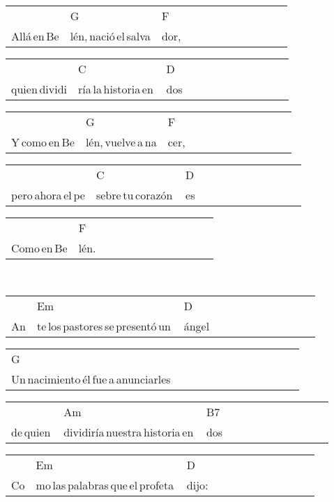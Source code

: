 \begin{multicols}{2}
\noindent
\begin{minipage}{\columnwidth}
\noindent
\noindent
\begin{tabular}{llllllllllll}
&G&F\\
Allá\,en\,Be&lén,\,nació\,el\,salva&dor,
\end{tabular}

\noindent
\begin{tabular}{llllllllllll}
&C&D\\
quien\,dividi&ría\,la\,historia\,en\,&dos
\end{tabular}

\noindent
\begin{tabular}{llllllllllll}
&G&F\\
Y\,como\,en\,Be&lén,\,vuelve\,a\,na&cer,
\end{tabular}

\noindent
\begin{tabular}{llllllllllll}
&C&D\\
pero\,ahora\,el\,pe&sebre\,tu\,corazón\,&es
\end{tabular}

\noindent
\begin{tabular}{llllllllllll}
&F\\
Como\,en\,Be&lén.
\end{tabular}
\end{minipage}\\

\noindent
\begin{minipage}{\columnwidth}
\noindent
\noindent
\begin{tabular}{llllllllllll}
&Em&D\\
An&te\,los\,pastores\,se\,presentó\,un\,&ángel
\end{tabular}

\noindent
\begin{tabular}{llllllllllll}
G\\
Un\,nacimiento\,él\,fue\,a\,anunciarles
\end{tabular}

\noindent
\begin{tabular}{llllllllllll}
&Am&B7\\
de\,quien\,&dividiría\,nuestra\,historia\,en\,&dos
\end{tabular}

\noindent
\begin{tabular}{llllllllllll}
&Em&D\\
Co&mo\,las\,palabras\,que\,el\,profeta\,&dijo:
\end{tabular}


\end{minipage}
\end{multicols}
